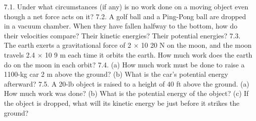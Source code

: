 






7.1. Under what circumstances (if any) is no work done on a moving object even though a net force acts on it?
7.2. A golf ball and a Ping-Pong ball are dropped in a vacuum chamber. When they have fallen halfway to the bottom,
how do their velocities compare? Their kinetic energies? Their potential energies?
7.3. The earth exerts a gravitational force of 2 × 10 20 N on the moon, and the moon travels 2.4 × 10 9 m each time it orbits
the earth. How much work does the earth do on the moon in each orbit?
7.4. (a) How much work must be done to raise a 1100-kg car 2 m above the ground? (b) What is the car’s potential energy
afterward?
7.5. A 20-lb object is raised to a height of 40 ft above the ground. (a) How much work was done? (b) What is the potential
energy of the object? (c) If the object is dropped, what will its kinetic energy be just before it strikes the ground?


